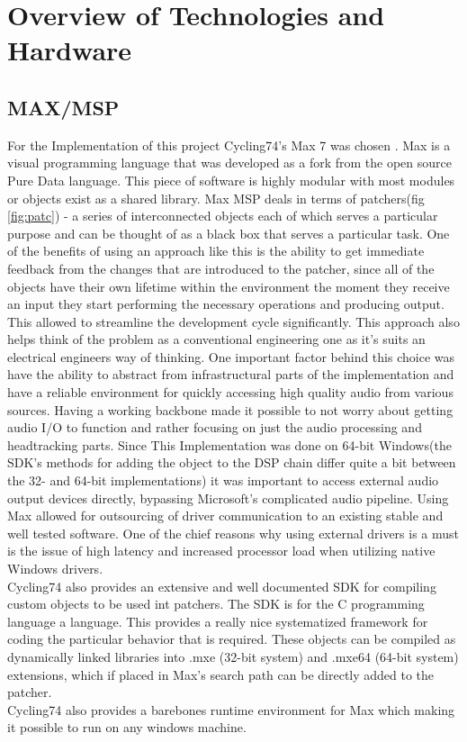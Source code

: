 \documentclass[a4paper,12pt,oneside]{article}
\begin{document}
\section{Overview of Technologies and Hardware}

\subsection{MAX/MSP}

For the Implementation of this project Cycling74's Max 7 was chosen \cite{max}. Max is a visual programming language that was developed as a fork from the open source Pure Data language. This piece of software is highly modular with most modules or objects exist as a shared library. Max MSP deals in terms of patchers(fig \ref{fig:patc}) - a series of interconnected objects each of which serves a particular purpose and can be thought of as a black box that serves a particular task. One of the benefits of using an approach like this is the ability to get immediate feedback from the changes that are introduced to the patcher, since all of the objects have their own lifetime within the environment the moment they receive an input they start performing the necessary operations and producing output. This allowed to streamline the development cycle significantly. This approach also helps think of the problem as a conventional engineering one as it's suits an electrical engineers way of thinking. One important factor behind this choice was have the ability to abstract from infrastructural parts of the implementation and have a reliable environment for quickly accessing high quality audio from various sources. Having a working backbone made it possible to not worry about getting audio I/O to function and rather focusing on just the audio processing and headtracking parts. Since This Implementation was done on 64-bit Windows(the SDK's methods for adding the object to the DSP chain differ quite a bit between the 32- and 64-bit implementations) it was important to access external audio output devices directly, bypassing Microsoft's complicated audio pipeline. Using Max allowed for outsourcing of driver communication to an existing stable and well tested software. One of the chief reasons why using external drivers is a must is the issue of high latency and increased processor load when utilizing native Windows drivers.\\
Cycling74 also provides an extensive and well documented SDK\cite{maxsdk} for compiling custom objects to be used int patchers. The SDK is for the C programming language a language. This provides a really nice systematized framework for coding the particular behavior that is required. These objects can be compiled as dynamically linked libraries into .mxe (32-bit system) and .mxe64 (64-bit system) extensions, which if placed in Max's search path can be directly added to the patcher.\\
Cycling74 also provides a barebones runtime environment for Max which making it possible to run on any windows machine.
\end{document}
